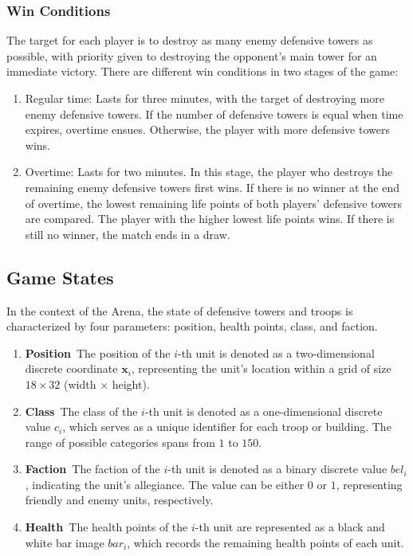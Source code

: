 \documentclass[runningheads]{llncs}
\def\bd{\boldsymbol}        %
\begin{document}
\subsubsection{Win Conditions}
The target for each player is to destroy as many enemy defensive towers as possible,
with priority given to destroying the opponent's main tower for an immediate victory.
There are different win conditions in two stages of the game:
\begin{enumerate}
\item Regular time: Lasts for three minutes, with the target of destroying more enemy defensive towers.
If the number of defensive towers is equal when time expires, overtime ensues.
Otherwise, the player with more defensive towers wins.
\item Overtime: Lasts for two minutes. In this stage, the player who destroys the remaining enemy defensive towers first wins.
If there is no winner at the end of overtime, the lowest remaining life points of both players' defensive towers are compared.
The player with the higher lowest life points wins. If there is still no winner, the match ends in a draw.
\end{enumerate}

\subsection{Game States}\label{sec-game-state}
In the context of the Arena, the state of defensive towers and troops is characterized by four parameters:
position, health points, class, and faction.

\begin{enumerate}
  \item \textbf{Position}~The position of the $i$-th unit is denoted as a two-dimensional discrete coordinate $\bd{x}_i$,
  representing the unit's location within a grid of size $18 \times 32$ (width $\times$ height).
  \item \textbf{Class}~The class of the $i$-th unit is denoted as a one-dimensional discrete value $c_i$,
  which serves as a unique identifier for each troop or building. The range of possible categories spans from $1$ to $150$.
  \item \textbf{Faction}~The faction of the $i$-th unit is denoted as a binary discrete value $bel_i$,
  indicating the unit's allegiance. The value can be either $0$ or $1$,
  representing friendly and enemy units, respectively.
  \item \textbf{Health}~The health points of the $i$-th unit are represented as a black and white bar image $bar_i$,
  which records the remaining health points of each unit.
\end{enumerate}
\end{document}
